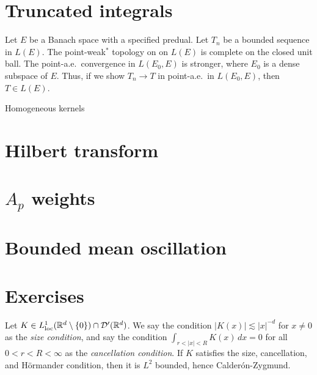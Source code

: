 \documentclass{../../large}
\begin{document}
\begin{prb}
\end{prb}


\section{Truncated integrals}


Let $E$ be a Banach space with a specified predual.
Let $T_n$ be a bounded sequence in $L(E)$.
The point-weak$^*$ topology on on $L(E)$ is complete on the closed unit ball.
The point-a.e.~convergence in $L(E_0,E)$ is stronger, where $E_0$ is a dense subspace of $E$.
Thus, if we show $T_n\to T$ in point-a.e.~in $L(E_0,E)$, then $T\in L(E)$.



Homogeneous kernels



\section{Hilbert transform}

\begin{prb}
\end{prb}
\begin{prb}
\end{prb}
\begin{prb}
\end{prb}






\section{$A_p$ weights}

\section{Bounded mean oscillation}


\section*{Exercises}
\begin{prb}
Let $K\in L_{\mathrm{loc}}^1(\mathbb{R}^d\setminus\{0\})\cap\mathcal{D}'(\mathbb{R}^d)$.
We say the condition $|K(x)|\lesssim|x|^{-d}$ for $x\ne0$ as the \emph{size condition}, and say the condition $\int_{r<|x|<R}K(x)\,dx=0$ for all $0<r<R<\infty$ as the \emph{cancellation condition}.
If $K$ satisfies the size, cancellation, and H\"ormander condition, then it is $L^2$ bounded, hence Calder\'on-Zygmund.
\end{prb}
\end{document}
